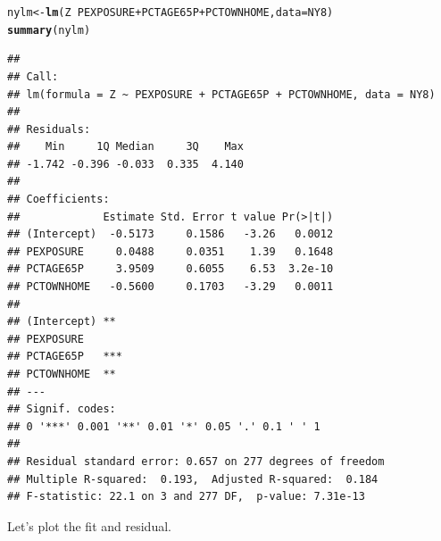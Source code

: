 \documentclass{article}\usepackage[]{graphicx}\usepackage[]{color}
\makeatletter
\newcommand{\hlopt}[1]{\textcolor[rgb]{0,0,0}{#1}}%
\newcommand{\hlstd}[1]{\textcolor[rgb]{0.345,0.345,0.345}{#1}}%
\newcommand{\hlkwb}[1]{\textcolor[rgb]{0.69,0.353,0.396}{#1}}%
\newcommand{\hlkwc}[1]{\textcolor[rgb]{0.333,0.667,0.333}{#1}}%
\newcommand{\hlkwd}[1]{\textcolor[rgb]{0.737,0.353,0.396}{\textbf{#1}}}%
\newenvironment{kframe}{%
 \def\at@end@of@kframe{}%
 \ifinner\ifhmode%
  \def\at@end@of@kframe{\end{minipage}}%
  \begin{minipage}{\columnwidth}%
 \fi\fi%
 \def\FrameCommand##1{\hskip\@totalleftmargin \hskip-\fboxsep
 \colorbox{shadecolor}{##1}\hskip-\fboxsep
     \hskip-\linewidth \hskip-\@totalleftmargin \hskip\columnwidth}%
 \MakeFramed {\advance\hsize-\width
   \@totalleftmargin\z@ \linewidth\hsize
   \@setminipage}}%
 {\par\unskip\endMakeFramed%
 \at@end@of@kframe}
\newenvironment{knitrout}{}{} %
\makeatother
\begin{document}
\begin{knitrout}
\color{fgcolor}\begin{kframe}
\begin{alltt}
\hlstd{nylm} \hlkwb{<-} \hlkwd{lm}\hlstd{(Z}\hlopt{~}\hlstd{PEXPOSURE}\hlopt{+}\hlstd{PCTAGE65P}\hlopt{+}\hlstd{PCTOWNHOME,} \hlkwc{data}\hlstd{=NY8)}
\hlkwd{summary}\hlstd{(nylm)}
\end{alltt}
\begin{verbatim}
## 
## Call:
## lm(formula = Z ~ PEXPOSURE + PCTAGE65P + PCTOWNHOME, data = NY8)
## 
## Residuals:
##    Min     1Q Median     3Q    Max 
## -1.742 -0.396 -0.033  0.335  4.140 
## 
## Coefficients:
##             Estimate Std. Error t value Pr(>|t|)
## (Intercept)  -0.5173     0.1586   -3.26   0.0012
## PEXPOSURE     0.0488     0.0351    1.39   0.1648
## PCTAGE65P     3.9509     0.6055    6.53  3.2e-10
## PCTOWNHOME   -0.5600     0.1703   -3.29   0.0011
##                
## (Intercept) ** 
## PEXPOSURE      
## PCTAGE65P   ***
## PCTOWNHOME  ** 
## ---
## Signif. codes:  
## 0 '***' 0.001 '**' 0.01 '*' 0.05 '.' 0.1 ' ' 1
## 
## Residual standard error: 0.657 on 277 degrees of freedom
## Multiple R-squared:  0.193,	Adjusted R-squared:  0.184 
## F-statistic: 22.1 on 3 and 277 DF,  p-value: 7.31e-13
\end{verbatim}
\end{kframe}
\end{knitrout}

Let's plot the fit and residual.
\end{document}
